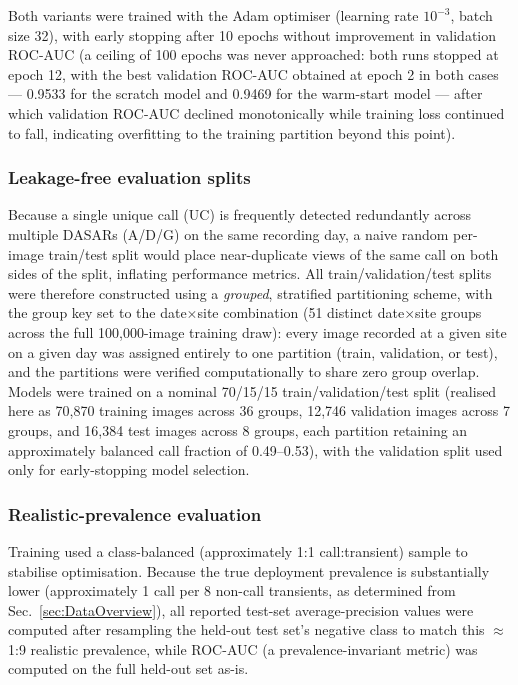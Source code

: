 \documentclass[preprint,NumberedRefs]{JASAnew}
\begin{document}
Both variants were trained with the Adam optimiser (learning rate
$10^{-3}$, batch size 32), with early stopping after 10 epochs without
improvement in validation ROC-AUC (a ceiling of 100 epochs was never
approached: both runs stopped at epoch 12, with the best validation
ROC-AUC obtained at epoch 2 in both cases — 0.9533 for the scratch model
and 0.9469 for the warm-start model — after which validation ROC-AUC
declined monotonically while training loss continued to fall, indicating
overfitting to the training partition beyond this point).

\subsubsection{Leakage-free evaluation splits}
Because a single unique call (UC) is frequently detected redundantly across
multiple DASARs (A/D/G) on the same recording day, a naive random
per-image train/test split would place near-duplicate views of the same
call on both sides of the split, inflating performance metrics. All
train/validation/test splits were therefore constructed using a
\emph{grouped}, stratified partitioning scheme, with the group key set to
the date$\times$site combination (51 distinct date$\times$site groups
across the full 100,000-image training draw): every image recorded at a
given site on a given day was assigned entirely to one partition (train,
validation, or test), and the partitions were verified computationally to
share zero group overlap. Models were trained on a nominal 70/15/15
train/validation/test split (realised here as 70,870 training images
across 36 groups, 12,746 validation images across 7 groups, and 16,384
test images across 8 groups, each partition retaining an approximately
balanced call fraction of 0.49--0.53), with the validation split used only
for early-stopping model selection.

\subsubsection{Realistic-prevalence evaluation}
Training used a class-balanced (approximately 1:1 call:transient) sample
to stabilise optimisation. Because the true deployment prevalence is
substantially lower (approximately 1 call per 8 non-call transients, as
determined from Sec.~\ref{sec:DataOverview}), all reported test-set
average-precision values were computed after resampling the held-out test
set's negative class to match this $\approx$1:9 realistic prevalence,
while ROC-AUC (a prevalence-invariant metric) was computed on the full
held-out set as-is.
\end{document}
